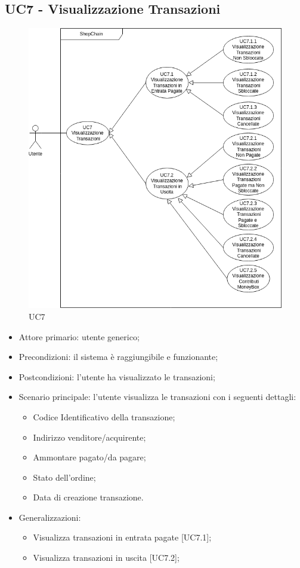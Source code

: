 \subsection{UC7 - Visualizzazione Transazioni}

\begin{figure}[H]
    \centering
    \includegraphics[scale=0.7]{immagini/UC7.png}
    \caption{UC7}
\end{figure}

\begin{itemize}
    \item Attore primario: utente generico;
    \item Precondizioni: il sistema è raggiungibile e funzionante;
    \item Postcondizioni: l'utente ha visualizzato le transazioni;
    \item Scenario principale: l'utente visualizza le transazioni con i seguenti dettagli:
        \begin{itemize}
            \item Codice Identificativo della transazione;
            \item Indirizzo venditore/acquirente;
            \item Ammontare pagato/da pagare;
            \item Stato dell'ordine;
            \item Data di creazione transazione.
        \end{itemize}
    \item Generalizzazioni:
          \begin{itemize}
              \item Visualizza transazioni in entrata pagate [UC7.1];
              \item Visualizza transazioni in uscita [UC7.2];
          \end{itemize}
\end{itemize}

